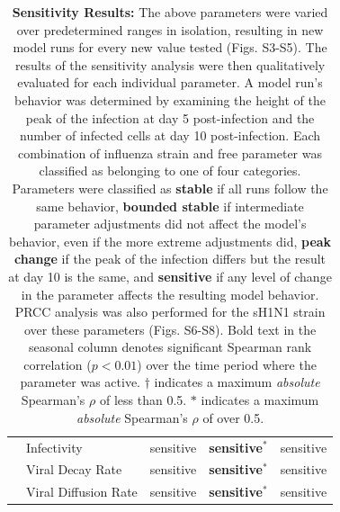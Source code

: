 \documentclass[preprint,10pt,authoryear]{elsarticle}
\begin{document}
\begin{table}[!ht]
\begin{center}
\begin{tabular}{| c | l | c c c |}
  & Infectivity & \cellcolor{red!40}sensitive & \cellcolor{red!40}\textbf{sensitive$^*$} & \cellcolor{red!40}sensitive \\
  & Viral Decay Rate & \cellcolor{red!40}sensitive & \cellcolor{red!40}\textbf{sensitive$^*$} & \cellcolor{red!40}sensitive \\
  & Viral Diffusion Rate & \cellcolor{red!40}sensitive & \cellcolor{red!40}\textbf{sensitive$^*$} & \cellcolor{red!40}sensitive \\
  \hline  
\end{tabular}
\caption{\textbf{Sensitivity Results:} The above parameters were varied over predetermined ranges in isolation, resulting in new model runs for every new value tested (Figs. S3-S5).  The results of the sensitivity analysis were then qualitatively evaluated for each individual parameter.  A model run's behavior was determined by examining the height of the peak of the infection at day 5 post-infection and the number of infected cells at day 10 post-infection.  Each combination of influenza strain and free parameter was classified as belonging to one of four categories.  Parameters were classified as \textbf{stable} if all runs follow the same behavior, \textbf{bounded stable} if intermediate parameter adjustments did not affect the model's behavior, even if the more extreme adjustments did, \textbf{peak change} if the peak of the infection differs but the result at day 10 is the same, and \textbf{sensitive} if any level of change in the parameter affects the resulting model behavior.  PRCC analysis was also performed for the sH1N1 strain over these parameters (Figs. S6-S8).  Bold text in the seasonal column denotes significant Spearman rank correlation ($p < 0.01$) over the time period where the parameter was active. $\dagger$ indicates a maximum \textit{absolute} Spearman's $\rho$ of less than 0.5.  $*$ indicates a maximum \textit{absolute} Spearman's $\rho$ of over 0.5.}
\label{tab:sensitivity}
\end{center}
\end{table}
\end{document}
